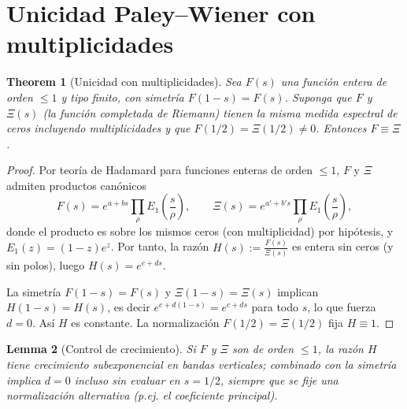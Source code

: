 \section{Unicidad Paley--Wiener con multiplicidades}

\newtheorem{theoremB}{Theorem}[section]
\newtheorem{lemmaB}[theoremB]{Lemma}

\begin{theoremB}[Unicidad con multiplicidades]
Sea $F(s)$ una función entera de orden $\le 1$ y tipo finito, con simetría $F(1-s)=F(s)$.
Suponga que $F$ y $\Xi(s)$ (la función completada de Riemann) tienen la misma medida
espectral de ceros incluyendo multiplicidades y que $F(1/2)=\Xi(1/2)\neq 0$.
Entonces $F\equiv \Xi$.
\end{theoremB}

\begin{proof}
Por teoría de Hadamard para funciones enteras de orden $\le 1$, $F$ y $\Xi$
admiten productos canónicos
\[
F(s)=e^{a+bs}\prod_\rho E_1\!\left(\frac{s}{\rho}\right),\qquad
\Xi(s)=e^{a'+b's}\prod_\rho E_1\!\left(\frac{s}{\rho}\right),
\]
donde el producto es sobre los mismos ceros (con multiplicidad) por hipótesis,
y $E_1(z)=(1-z)e^{z}$.
Por tanto, la razón $H(s):=\frac{F(s)}{\Xi(s)}$ es entera sin ceros (y sin polos), luego $H(s)=e^{c+ds}$.

La simetría $F(1-s)=F(s)$ y $\Xi(1-s)=\Xi(s)$ implican
$H(1-s)=H(s)$, es decir $e^{c+d(1-s)}=e^{c+ds}$ para todo $s$, lo que fuerza $d=0$.
Así $H$ es constante. La normalización $F(1/2)=\Xi(1/2)$ fija $H\equiv 1$.
\end{proof}

\begin{lemmaB}[Control de crecimiento]
Si $F$ y $\Xi$ son de orden $\le 1$, la razón $H$ tiene crecimiento subexponencial en bandas verticales; combinado con la simetría implica $d=0$ incluso sin evaluar en $s=1/2$, siempre que se fije una normalización alternativa (p.ej. el coeficiente principal).
\end{lemmaB}
